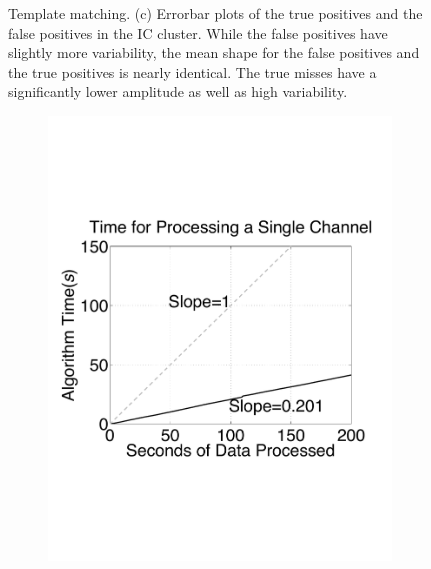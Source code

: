 \begin{center}
\begin{figure}[h!]
\begin{subfigure}[b]{.33\textwidth}
\caption{}
\label{truewaveforms}
\end{subfigure}
\caption{Template matching.
(c) Errorbar plots of the true positives and the false positives in the IC cluster.  While the false positives have slightly more variability, the mean shape for the false positives and the true positives is nearly identical.  The true misses have a significantly lower amplitude as well as high variability. 
} \label{fig:IC-PCA}
\end{figure}
\end{center}



\begin{center}
\begin{figure}[h!]
\begin{subfigure}[b]{.5\textwidth}
\includegraphics[width=\textwidth]{../figs/new/timingsinglechannel.pdf}
\caption{}
\label{fig:ICold}
\end{subfigure}
\begin{subfigure}[b]{.5\textwidth}
\caption{}
\label{fig:ICold}
\end{subfigure}
\caption{ 
} \label{fig:timing}
\end{figure}
\end{center}












